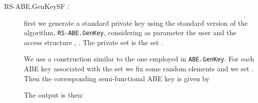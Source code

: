 \documentclass[a4paper,10pt]{article}
\newcommand{\maps}[2]{}
\newcommand{\mapssingleoutput}[2]{}
\newcommand{\algorithm}[2]{\texttt{#1.#2}}
\newcommand{\algorithmdef}[4]{\item[#1.#2 \maps{#3}{#4}:]}
\newcommand{\algorithmdefsingleoutput}[4]{\item[#1.#2 \mapssingleoutput{#3}{#4}:] }
\begin{document}
	\begin{description}
	
\algorithmdefsingleoutput{RS-ABE}{GenKeySF}{\mathrm{PI},\mathrm{PK},\mathrm{MK},\mathbb{A},u}{\mathrm{SK}_{\mathbb{A},u}} first we generate a standard private key  using the standard version of the algorithm, \algorithm{RS-ABE}{GenKey}, considering as parameter the user  and the access structure , . The private set is the set .
	
	We use a construction similar to the one employed in \algorithm{ABE}{GenKey}. For each ABE key  associated with the set  we fix some random elements  and we set . 
	Then the corresponding semi-functional ABE key is given by \linebreak  
	
	The output is then:
	
	
\begin{comment}


	\algorithmdefsingleoutput{RS-ABE}{UpdateKeySF}{\mathrm{PI},\mathrm{PK},\mathrm{MK},T,R}{\mathrm{TK}_{T,R}} the first step is to generate a standard time-update key  using the standard \algorithm{RS-ABE}{UpdateKey}, associating it to the time  and the set of revoked users . The covering set is the set .
	
	The final result is very similar to the output of \algorithm{SUE}{GenKey}. For each SUE key  associated with the set  the corresponding semi-functional SUE keys is given by 
	
	We output the semi-functional time key .



\algorithmdef{SUE}{EncryptSF}{\mathrm{PK},T,c}{EK,CH_{S,T}}  first we generate a standard ciphertext header  for a time  and a session key . Moreover we denote with  the label of length  associated with the ciphertext header . We call also .
We choose randomly the elements , , and .
We define then .
\begin{enumerate}
	\item
	We write the first CDE header as .
	The first semi-functional CDE ciphertext for  is 
	\item
	For each  from  to  we do the following:
	\begin{itemize}
		\item
		If  is empty, then  remains empty.
		\item
		Otherwise we fix  and we set:
	
	\end{itemize}
\end{enumerate}
The final output is	 and .


\end{comment}
\end{description}
\end{document}
